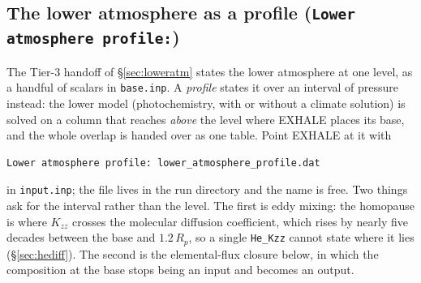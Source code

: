 \documentclass[english,a4paper]{my_memo}
\begin{document}
\subsection{The lower atmosphere as a profile
(\texttt{Lower atmosphere profile:})}\label{sec:lowerprofile}
The Tier-3 handoff of \S\ref{sec:loweratm} states the lower atmosphere at one
level, as a handful of scalars in \texttt{base.inp}. A \emph{profile} states it
over an interval of pressure instead: the lower model (photochemistry, with or
without a climate solution) is solved on a column that reaches \emph{above} the
level where EXHALE places its base, and the whole overlap is handed over as one
table. Point EXHALE at it with

\begin{verbatim}
Lower atmosphere profile: lower_atmosphere_profile.dat
\end{verbatim}

in \texttt{input.inp}; the file lives in the run directory and the name is
free. Two things ask for the interval rather than the level. The first is eddy
mixing: the homopause is where $K_{zz}$ crosses the molecular diffusion
coefficient, which rises by nearly five decades between the base and
$1.2\,R_p$, so a single \texttt{He\_Kzz} cannot state where it lies
(\S\ref{sec:hediff}). The second is the elemental-flux closure below, in which
the composition at the base stops being an input and becomes an output.
\end{document}
